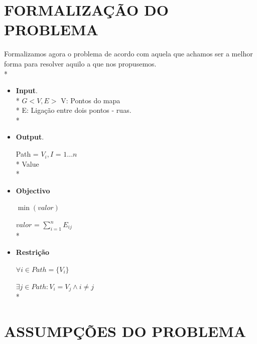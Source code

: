 \documentclass[a4paper]{article}
\begin{document}




\section{FORMALIZAÇÃO DO PROBLEMA}

\begin{small}
Formalizamos agora o problema de acordo com aquela que achamos ser a melhor forma para resolver aquilo a que nos propusemos. \\*
\end{small}

\begin{itemize}
    \item \textbf{\Large{Input}}. \\*
    $ G < V, E > $
    V: Pontos do mapa \\*
    E: Ligação entre dois pontos - ruas. \\*
    \item \textbf{\Large{Output}}. 
    
    Path = $V_{i},I$ = $1...n$ \\*
    Value \\*

    \item \textbf{\Large{Objectivo}}
    
    $\min(valor)$

    $valor$ = $\sum_{i=1}^{n} E_{ij}$\\*
    
    
    \item \textbf{\Large{Restrição}}
    
    $\forall {i} \in Path = \{V_{i}\}$
    
    $\exists {j} \in  Path : V_{i} = V_{j} \wedge i \neq j$\\*
    
    \end{itemize}
    
\setcounter{secnumdepth}{0}
\section{ASSUMPÇÕES DO PROBLEMA}
\end{document}
